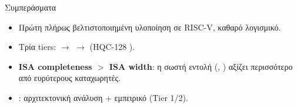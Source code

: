 \begin{frame}{Συμπεράσματα}
  \begin{itemize}
    \item Πρώτη πλήρως βελτιστοποιημένη υλοποίηση \HQC σε RISC-V, καθαρό λογισμικό.
    \item Τρία tiers:  $\rightarrow$  $\rightarrow$  (HQC-128 ).
    \item \textbf{ISA completeness $>$ ISA width}: η σωστή εντολή (\clmul, \vror) αξίζει περισσότερο από ευρύτερους καταχωρητές.
    \ifincludeCT\item {}: αρχιτεκτονική ανάλυση  + εμπειρικό  (Tier 1/2).\fi
  \end{itemize}
\end{frame}
